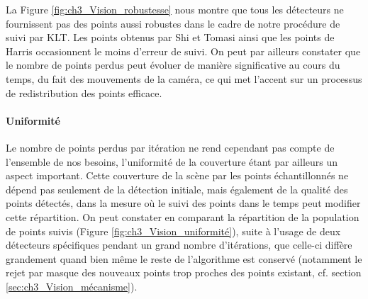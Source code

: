 La Figure \ref{fig:ch3_Vision_robustesse} nous montre que tous les détecteurs ne fournissent pas des points aussi robustes dans le cadre de notre procédure de suivi par KLT. Les points obtenus par Shi et Tomasi ainsi que les points de Harris occasionnent le moins d'erreur de suivi. On peut par ailleurs constater que le nombre de points perdus peut évoluer de manière significative au cours du temps, du fait des mouvements de la caméra, ce qui met l'accent sur un processus de redistribution des points efficace.

\paragraph{Uniformité\\} \label{Vision_uniformité}
Le nombre de points perdus par itération ne rend cependant pas compte de l'ensemble de nos besoins, l'uniformité de la couverture étant par ailleurs un aspect important. Cette couverture de la scène par les points échantillonnés ne dépend pas seulement de la détection initiale, mais également de la qualité des points détectés, dans la mesure où le suivi des points dans le temps peut modifier cette répartition. On peut constater en comparant la répartition de la population de points suivis (Figure \ref{fig:ch3_Vision_uniformité}), suite à l'usage de deux détecteurs spécifiques pendant un grand nombre d'itérations, que celle-ci diffère grandement quand bien même le reste de l'algorithme est conservé (notamment le rejet par masque des nouveaux points trop proches des points existant, cf. section \ref{sec:ch3_Vision_mécanisme}).

